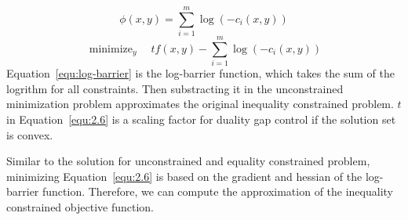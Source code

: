 \begin{equation}
\label{equ:log-barrier}
\phi(x, y)=\sum_{i=1}^{m} \log \left(-c_{i}(x, y)\right)
\end{equation}
\begin{equation}
\label{equ:2.6}
\operatorname{minimize}_{y} \quad t f(x, y)-\sum_{i=1}^{m} \log \left(-c_{i}(x, y)\right)
\end{equation}
Equation~\ref{equ:log-barrier} is the log-barrier function, which takes the sum of the logrithm for all constraints. Then substracting it in the unconstrained minimization problem approximates the original inequality constrained problem. $t$ in Equation~\ref{equ:2.6} is a scaling factor for duality gap control if the solution set is convex. 
\par Similar to the solution for unconstrained and equality constrained problem, minimizing Equation~\ref{equ:2.6} is based on the gradient and hessian of the log-barrier function. Therefore, we can compute the approximation of the inequality constrained objective function. 

